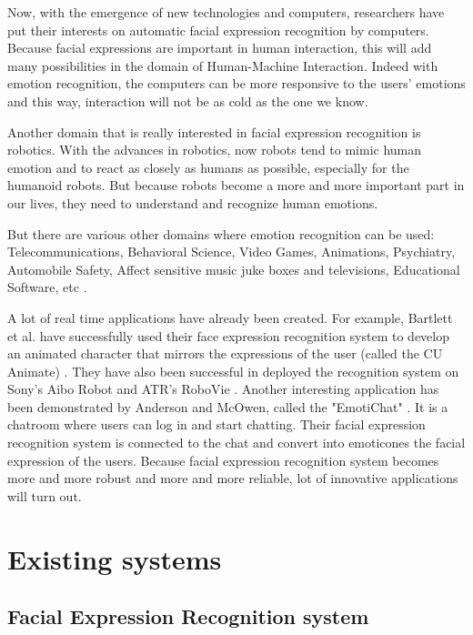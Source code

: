 \noindent Now, with the emergence of new technologies and computers, researchers have put their interests on automatic facial expression recognition by computers. Because facial expressions are important in human interaction, this will add many possibilities in the domain of Human-Machine Interaction. Indeed with emotion recognition, the computers can be more responsive to the users' emotions and this way, interaction will not be as cold as the one we know. 
\newline

\noindent Another domain that is really interested in facial expression recognition is robotics. With the advances in robotics, now robots tend to mimic human emotion and to react as closely as humans as possible, especially for the humanoid robots. But because robots become a more and more important part in our lives, they need to understand and recognize human emotions.
\newline

\noindent But there are various other domains where emotion recognition can be used: Telecommunications, Behavioral Science, Video Games, Animations, Psychiatry, Automobile Safety, Affect sensitive music juke boxes and televisions, Educational Software, etc \cite{BET12}.
\newline

\noindent A lot of real time applications have already been created. For example, Bartlett et al. have successfully used their face expression recognition system to develop an animated character that mirrors the expressions of the user (called the CU Animate) \cite{BAR03}. They have also been successful in deployed the recognition system on Sony's Aibo Robot and ATR's RoboVie \cite{BAR03}. Another interesting application has been demonstrated by Anderson and McOwen, called the "EmotiChat" \cite{AND06}. It is a chatroom where users can log in and start chatting. Their facial expression recognition system is connected to the chat and convert into emoticones the facial expression of the users. Because facial expression recognition system becomes more and more robust and more and more reliable, lot of innovative applications will turn out.
\newpage

\chapter{Existing systems}

\section{Facial Expression Recognition system}

